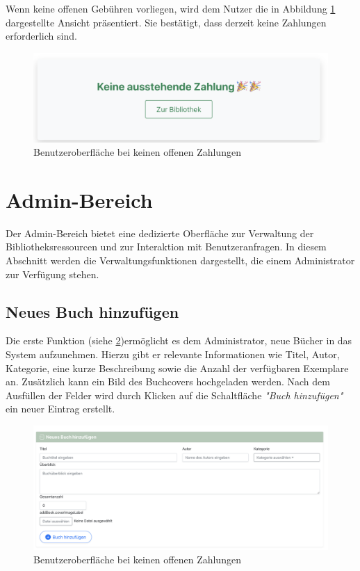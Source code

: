 \noindent Wenn keine offenen Gebühren vorliegen, wird dem Nutzer die in Abbildung \ref{fig:No-Payment} dargestellte Ansicht präsentiert. Sie bestätigt, dass derzeit keine Zahlungen erforderlich sind.

\begin{figure}[H]
	\centering
	\includegraphics[width=1.0\textwidth]{images/UI-screenshots/No-Payment.png}
	\caption{Benutzeroberfläche bei keinen offenen Zahlungen}
	\label{fig:No-Payment}
\end{figure}

\section{Admin-Bereich}

Der Admin-Bereich bietet eine dedizierte Oberfläche zur Verwaltung der Bibliotheksressourcen und zur Interaktion mit Benutzeranfragen. In diesem Abschnitt werden die Verwaltungsfunktionen dargestellt, die einem Administrator zur Verfügung stehen.

\subsection{Neues Buch hinzufügen}
\noindent Die erste Funktion (siehe \ref{fig:Add-New-Book})ermöglicht es dem Administrator, neue Bücher in das System aufzunehmen. Hierzu gibt er relevante Informationen wie Titel, Autor, Kategorie, eine kurze Beschreibung sowie die Anzahl der verfügbaren Exemplare an. Zusätzlich kann ein Bild des Buchcovers hochgeladen werden. Nach dem Ausfüllen der Felder wird durch Klicken auf die Schaltfläche \textit{"Buch hinzufügen"} ein neuer Eintrag erstellt.
\begin{figure}[H]
	\centering
	\includegraphics[width=1.0\textwidth]{images/UI-screenshots/Add-New-Book.png}
	\caption{Benutzeroberfläche bei keinen offenen Zahlungen}
	\label{fig:Add-New-Book}
\end{figure}

